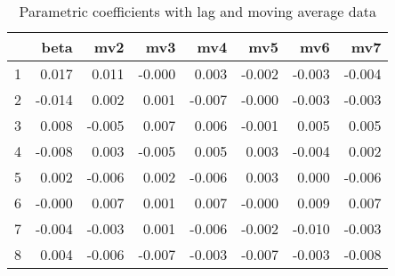 \documentclass[a4paper, 12pt]{article}
\begin{document}
\begin{table}[h]
\centering
\caption{Parametric coefficients with lag and moving average data}
\begin{tabular}{rrrrrrrr}
  \hline
 & beta & mv2 & mv3 & mv4 & mv5 & mv6 & mv7 \\
  \hline
1 & 0.017 & 0.011 & -0.000 & 0.003 & -0.002 & -0.003 & -0.004 \\
  2 & -0.014 & 0.002 & 0.001 & -0.007 & -0.000 & -0.003 & -0.003 \\
  3 & 0.008 & -0.005 & 0.007 & 0.006 & -0.001 & 0.005 & 0.005 \\
  4 & -0.008 & 0.003 & -0.005 & 0.005 & 0.003 & -0.004 & 0.002 \\
  5 & 0.002 & -0.006 & 0.002 & -0.006 & 0.003 & 0.000 & -0.006 \\
  6 & -0.000 & 0.007 & 0.001 & 0.007 & -0.000 & 0.009 & 0.007 \\
  7 & -0.004 & -0.003 & 0.001 & -0.006 & -0.002 & -0.010 & -0.003 \\
  8 & 0.004 & -0.006 & -0.007 & -0.003 & -0.007 & -0.003 & -0.008 \\
   \hline
\end{tabular}
\end{table}
\clearpage
\end{document}
